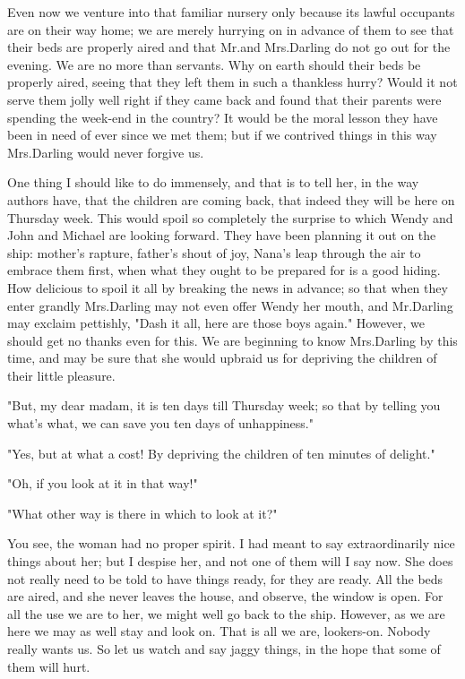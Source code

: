 Even now we venture into that familiar nursery only because its lawful occupants are on their way home;
we are merely hurrying on in advance of them
to see that their beds are properly aired and that Mr.\@ and Mrs.\@ Darling do not go out for the evening.
We are no more than servants.
Why on earth should their beds be properly aired,
seeing that they left them in such a thankless hurry?
Would it not serve them jolly well right if they came back
and found that their parents were spending the week-end in the country?
It would be the moral lesson they have been in need of ever since we met them;
but if we contrived things in this way Mrs.\@ Darling would never forgive us.

One thing I should like to do immensely,
and that is to tell her, in the way authors have, that the children are coming back,
that indeed they will be here on Thursday week.
This would spoil so completely the surprise to which Wendy and John and Michael are looking forward.
They have been planning it out on the ship:
mother's rapture, father's shout of joy, Nana's leap through the air to embrace them first,
when what they ought to be prepared for is a good hiding.
How delicious to spoil it all by breaking the news in advance;
so that when they enter grandly Mrs.\@ Darling may not even offer Wendy her mouth,
and Mr.\@ Darling may exclaim pettishly, "Dash it all, here are those boys again."
However, we should get no thanks even for this.
We are beginning to know Mrs.\@ Darling by this time,
and may be sure that she would upbraid us for depriving the children of their little pleasure.

"But, my dear madam, it is ten days till Thursday week;
so that by telling you what's what, we can save you ten days of unhappiness."

"Yes, but at what a cost!
By depriving the children of ten minutes of delight."

"Oh, if you look at it in that way!"

"What other way is there in which to look at it?"

You see, the woman had no proper spirit.
I had meant to say extraordinarily nice things about her;
but I despise her, and not one of them will I say now.
She does not really need to be told to have things ready, for they are ready.
All the beds are aired, and she never leaves the house, and observe, the window is open.
For all the use we are to her, we might well go back to the ship.
However, as we are here we may as well stay and look on.
That is all we are, lookers-on.
Nobody really wants us.
So let us watch and say jaggy things, in the hope that some of them will hurt.

